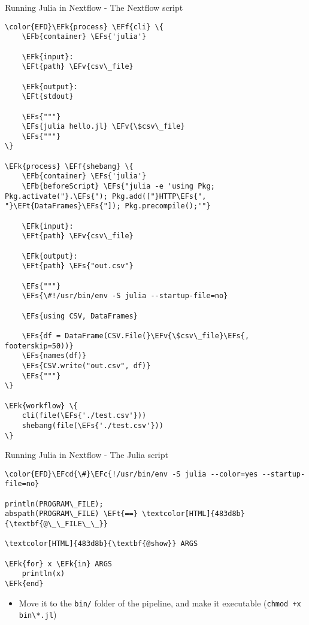 \documentclass[bigger]{beamer}
\newcommand{\EFc}[1]{\textcolor{EFc}{#1}} %
\newcommand{\EFcd}[1]{\textcolor{EFcd}{#1}} %
\newcommand{\EFs}[1]{\textcolor{EFs}{#1}} %
\newcommand{\EFk}[1]{\textcolor{EFk}{#1}} %
\newcommand{\EFb}[1]{\textcolor{EFb}{#1}} %
\newcommand{\EFf}[1]{\textcolor{EFf}{#1}} %
\newcommand{\EFv}[1]{\textcolor{EFv}{#1}} %
\newcommand{\EFt}[1]{\textcolor{EFt}{#1}} %
\begin{document}
\begin{frame}[label={sec:org960aa5f},fragile]{Running Julia in Nextflow - The Nextflow script}
 \small
\begin{Code}
\begin{Verbatim}
\color{EFD}\EFk{process} \EFf{cli} \{
    \EFb{container} \EFs{'julia'}

    \EFk{input}:
    \EFt{path} \EFv{csv\_file}

    \EFk{output}:
    \EFt{stdout}

    \EFs{"""}
    \EFs{julia hello.jl} \EFv{\$csv\_file}
    \EFs{"""}
\}

\EFk{process} \EFf{shebang} \{
    \EFb{container} \EFs{'julia'}
    \EFb{beforeScript} \EFs{"julia -e 'using Pkg; Pkg.activate("}.\EFs{"); Pkg.add(["}HTTP\EFs{", "}\EFt{DataFrames}\EFs{"]); Pkg.precompile();'"}

    \EFk{input}:
    \EFt{path} \EFv{csv\_file}

    \EFk{output}:
    \EFt{path} \EFs{"out.csv"}

    \EFs{"""}
    \EFs{\#!/usr/bin/env -S julia --startup-file=no}

    \EFs{using CSV, DataFrames}

    \EFs{df = DataFrame(CSV.File(}\EFv{\$csv\_file}\EFs{, footerskip=50))}
    \EFs{names(df)}
    \EFs{CSV.write("out.csv", df)}
    \EFs{"""}
\}

\EFk{workflow} \{
    cli(file(\EFs{'./test.csv'}))
    shebang(file(\EFs{'./test.csv'}))
\}
\end{Verbatim}
\end{Code}
\end{frame}

\begin{frame}[label={sec:orge807967},fragile]{Running Julia in Nextflow - The Julia script}
 \begin{Code}
\begin{Verbatim}
\color{EFD}\EFcd{\#}\EFc{!/usr/bin/env -S julia --color=yes --startup-file=no}

println(PROGRAM\_FILE);
abspath(PROGRAM\_FILE) \EFt{==} \textcolor[HTML]{483d8b}{\textbf{@\_\_FILE\_\_}}

\textcolor[HTML]{483d8b}{\textbf{@show}} ARGS

\EFk{for} x \EFk{in} ARGS
    println(x)
\EFk{end}
\end{Verbatim}
\end{Code}

\begin{itemize}
\item Move it to the \texttt{bin/} folder of the pipeline, and make it executable (\texttt{chmod +x bin\textbackslash{}*.jl})
\end{itemize}
\end{frame}
\end{document}
